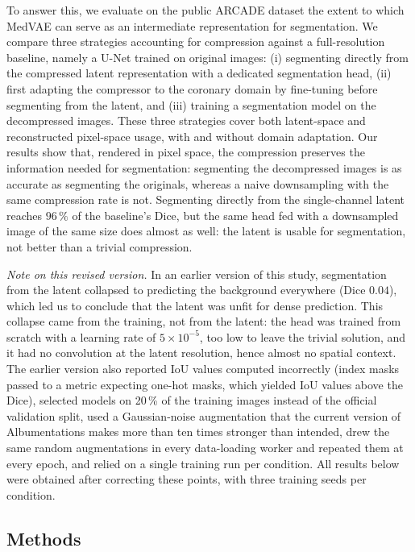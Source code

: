 \documentclass[conference]{IEEEtran}
\begin{document}
To answer this, we evaluate on the public ARCADE dataset \cite{popov2024arcade} the extent to which MedVAE can serve as an intermediate representation for segmentation. We compare three strategies accounting for compression against a full-resolution baseline, namely a U-Net \cite{ronneberger2015unet} trained on original images: (i) segmenting directly from the compressed latent representation with a dedicated segmentation head, (ii) first adapting the compressor to the coronary domain by fine-tuning before segmenting from the latent, and (iii) training a segmentation model on the decompressed images. These three strategies cover both latent-space and reconstructed pixel-space usage, with and without domain adaptation. Our results show that, rendered in pixel space, the compression preserves the information needed for segmentation: segmenting the decompressed images is as accurate as segmenting the originals, whereas a naive downsampling with the same compression rate is not. Segmenting directly from the single-channel latent reaches $96\,\%$ of the baseline's Dice, but the same head fed with a downsampled image of the same size does almost as well: the latent is usable for segmentation, not better than a trivial compression.

\emph{Note on this revised version.} In an earlier version of this study, segmentation from the latent collapsed to predicting the background everywhere (Dice $0.04$), which led us to conclude that the latent was unfit for dense prediction. This collapse came from the training, not from the latent: the head was trained from scratch with a learning rate of $5\times10^{-5}$, too low to leave the trivial solution, and it had no convolution at the latent resolution, hence almost no spatial context. The earlier version also reported IoU values computed incorrectly (index masks passed to a metric expecting one-hot masks, which yielded IoU values above the Dice), selected models on 20\,\% of the training images instead of the official validation split, used a Gaussian-noise augmentation that the current version of Albumentations makes more than ten times stronger than intended, drew the same random augmentations in every data-loading worker and repeated them at every epoch, and relied on a single training run per condition. All results below were obtained after correcting these points, with three training seeds per condition.

\subsection{Methods}
\end{document}
